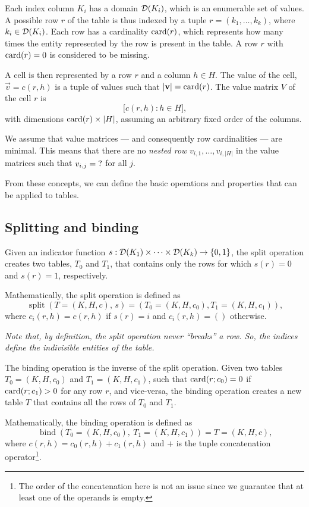 Each index column $K_i$ has a domain $\domainof{K_i}$, which is an enumerable set of
values. A possible row $r$ of the table is thus indexed by a tuple $r = (k_1, \dots,
k_k)$, where $k_i \in \domainof{K_i}$.  Each row has a cardinality $\rowcard[r]$, which
represents how many times the entity represented by the row is present in the table.
A row $r$ with $\rowcard[r] = 0$ is considered to be missing.

A cell is then represented by a row $r$ and a column $h \in H$.  The value of the cell,
$\vec{v} = c(r, h)$ is a tuple of values such that $|\vec{v}| = \rowcard[r]$.
The value matrix $V$ of the cell $r$ is \[
  \Big[ c(r, h) : h \in H \Big]\text{,}
\] with dimensions $\rowcard[r] \times |H|$, assuming an arbitrary fixed order of the
columns.

We assume that value matrices --- and consequently row cardinalities --- are minimal. This
means that there are no \emph{nested row} $v_{i, 1}, \dots, v_{i, |H|}$ in the value matrices
such that $v_{i, j} = \missing$ for all $j$.

From these concepts, we can define the basic operations and properties that can be applied
to tables.

\subsection{Splitting and binding}

Given an indicator function $s : \domainof{K_1} \times \dots \times \domainof{K_k} \to
\left\{0, 1\right\}$, the split operation creates two tables, $T_0$ and $T_1$, that
contains only the rows for which
$s(r) = 0$ and $s(r) = 1$, respectively.

Mathematically, the split operation is defined as \[
  \operatorname{split}(T = (K, H, c),\, s) =
    \left(T_0 = (K, H, c_0), T_1 = (K, H, c_1)\right)\text{,}
\] where $c_i(r, h) = c(r, h)$ if $s(r) = i$ and $c_i(r, h) = ()$ otherwise.

\emph{Note that, by definition, the split operation never ``breaks'' a row.  So, the
indices define the indivisible entities of the table.}

The binding operation is the inverse of the split operation.  Given two tables $T_0 = (K,
H, c_0)$ and $T_1 = (K, H, c_1)$, such that $\rowcard[r; c_0] = 0$ if $\rowcard[r; c_1] >
0$ for any row $r$, and vice-versa, the binding operation creates a new table $T$ that
contains all the rows of $T_0$ and $T_1$.

Mathematically, the binding operation is defined as \[
  \operatorname{bind}(T_0 = (K, H, c_0),~T_1 = (K, H, c_1)) =
    T = (K, H, c)\text{,}
\] where $c(r, h) = c_0(r, h) + c_1(r, h)$ and $+$ is the tuple concatenation
operator\footnote{The order of the concatenation here is not an issue since we guarantee
that at least one of the operands is
empty.}.

